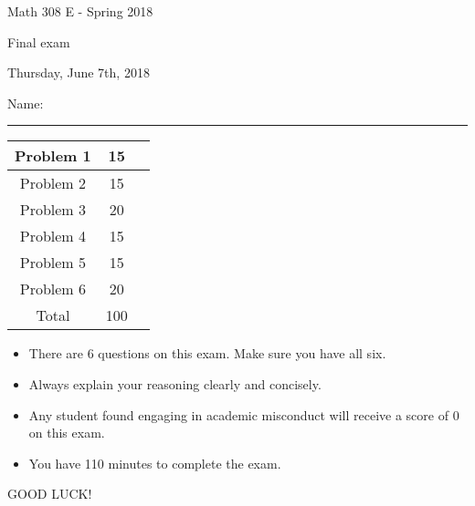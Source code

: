 \documentclass[12 pt]{report}
\begin{document}
\noindent \vfill \noindent \large

\centerline{Math 308 E - Spring 2018}

\centerline{Final exam}

\centerline{Thursday, June 7th, 2018}

\normalsize

\vfill
\medskip
Name: \rule{10cm}{1pt}

\bigskip

\vfill
\begin{center}
{\large
\begin{tabular}{||c|c|r||}
\hline Problem 1 & 15 & \hspace{10mm} \hfill \\
\hline Problem 2 & 15 & \hspace{10mm} \hfill \\
\hline Problem 3 & 20 & \hspace{10mm} \hfill \\
\hline Problem 4 & 15 & \hspace{10mm} \hfill \\
\hline Problem 5 & 15 & \hspace{10mm} \hfill \\
\hline Problem 6 & 20 & \hspace{10mm} \hfill \\
\hline Total & 100 & \hspace{10mm} \hfill \\
\hline
\end{tabular}
}
\end{center}
\vfill
\begin{itemize}
\item There are 6 questions on this exam. Make sure you have all six.
\item Always explain your reasoning clearly and concisely. 
\item Any student found engaging in academic misconduct will receive
a score of 0 on this exam.
\item You have 110 minutes to complete the exam. \\
\end{itemize}
\vfill
\begin{center}GOOD LUCK!\end{center}

\newpage
\end{document}
